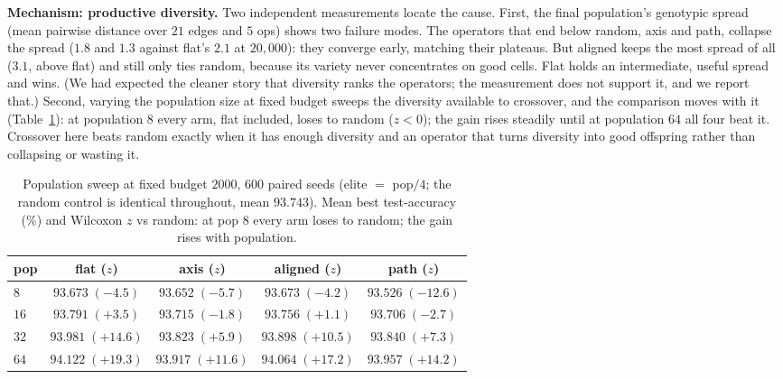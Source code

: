 \documentclass[11pt]{article}
\begin{document}
\textbf{Mechanism: productive diversity.} Two independent measurements locate the cause. First,
the final population's genotypic spread (mean pairwise distance over $21$ edges and $5$ ops)
shows two failure modes. The operators that end below random, axis and path, collapse the spread
($1.8$ and $1.3$ against flat's $2.1$ at $20{,}000$): they converge early, matching their
plateaus. But aligned keeps the most spread of all ($3.1$, above flat) and still only ties
random, because its variety never concentrates on good cells. Flat holds an intermediate,
useful spread and wins. (We had expected the cleaner story that diversity ranks the operators;
the measurement does not support it, and we report that.) Second, varying the population size at
fixed budget sweeps the diversity available to crossover, and the comparison moves with it
(Table~\ref{tab:pop}): at population $8$ every arm, flat included, loses to random ($z<0$); the
gain rises steadily until at population $64$ all four beat it. Crossover here beats random
exactly when it has enough diversity and an operator that turns diversity into good offspring
rather than collapsing or wasting it.

\begin{table}[t]
\centering
\caption{Population sweep at fixed budget $2000$, $600$ paired seeds (elite $=$ pop$/4$; the
random control is identical throughout, mean $93.743$). Mean best test-accuracy (\%) and
Wilcoxon $z$ vs random: at pop $8$ every arm loses to random; the gain rises with population.}
\label{tab:pop}
\begin{tabular}{lcccc}
\toprule
pop & flat ($z$) & axis ($z$) & aligned ($z$) & path ($z$) \\
\midrule
$8$  & $93.673\;(-4.5)$ & $93.652\;(-5.7)$ & $93.673\;(-4.2)$ & $93.526\;(-12.6)$ \\
$16$ & $93.791\;(+3.5)$ & $93.715\;(-1.8)$ & $93.756\;(+1.1)$ & $93.706\;(-2.7)$  \\
$32$ & $93.981\;(+14.6)$& $93.823\;(+5.9)$ & $93.898\;(+10.5)$& $93.840\;(+7.3)$  \\
$64$ & $\mathbf{94.122}\;(+19.3)$& $93.917\;(+11.6)$& $94.064\;(+17.2)$& $93.957\;(+14.2)$ \\
\bottomrule
\end{tabular}
\end{table}
\end{document}
